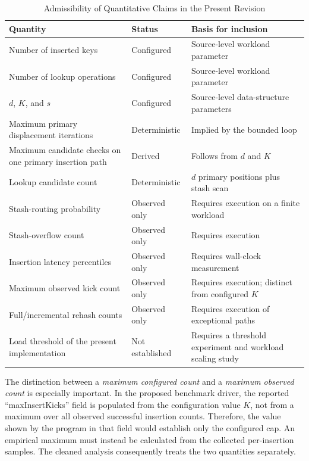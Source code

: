 \documentclass[conference]{IEEEtran}
\begin{document}
\begin{table}[!t]
\caption{Admissibility of Quantitative Claims in the Present Revision}
\label{tab:result-status}
\centering
\scriptsize
\setlength{\tabcolsep}{2.5pt}
\begin{tabular}{@{}p{}p{}p{}@{}}
\toprule
\textbf{Quantity} & \textbf{Status} & \textbf{Basis for inclusion} \\
\midrule
Number of inserted keys & Configured & Source-level workload parameter \\
Number of lookup operations & Configured & Source-level workload parameter \\
$d$, $K$, and $s$ & Configured & Source-level data-structure parameters \\
Maximum primary displacement iterations & Deterministic & Implied by the bounded loop \\
Maximum candidate checks on one primary insertion path & Derived & Follows from $d$ and $K$ \\
Lookup candidate count & Deterministic & $d$ primary positions plus stash scan \\
Stash-routing probability & Observed only & Requires execution on a finite workload \\
Stash-overflow count & Observed only & Requires execution \\
Insertion latency percentiles & Observed only & Requires wall-clock measurement \\
Maximum observed kick count & Observed only & Requires execution; distinct from configured $K$ \\
Full/incremental rehash counts & Observed only & Requires execution of exceptional paths \\
Load threshold of the present implementation & Not established & Requires a threshold experiment and workload scaling study \\
\bottomrule
\end{tabular}
\end{table}

The distinction between a \emph{maximum configured count} and a \emph{maximum observed count} is especially important. In the proposed benchmark driver, the reported ``maxInsertKicks'' field is populated from the configuration value $K$, not from a maximum over all observed successful insertion counts. Therefore, the value shown by the program in that field would establish only the configured cap. An empirical maximum must instead be calculated from the collected per-insertion samples. The cleaned analysis consequently treats the two quantities separately.
\end{document}
